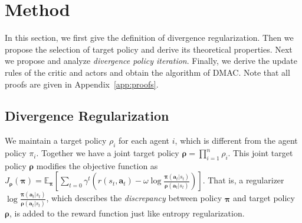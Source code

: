 \documentclass{article}
\begin{document}







\section{Method}
In this section, we first give the definition of divergence regularization. Then we propose the selection of target policy and derive its theoretical properties. Next we propose and analyze \textit{divergence policy iteration}. Finally, we derive the update rules of the critic and actors and obtain the algorithm of DMAC. Note that all proofs are given in Appendix~\ref{app:proofs}.


\subsection{Divergence Regularization}
We maintain a target policy $\rho_i$ for each agent $i$, which is different from the agent policy $\pi_i$. Together we have a joint target policy ${\bm{\rho}} = \prod_{i=1}^n \rho_i$. This joint target policy ${\bm{\rho}}$ modifies the objective function as 
$J_{\bm{\rho}}({\bm{\pi}}) = \mathbb{E}_{\bm{\pi}}\left[ \sum_{t = 0} \gamma^t \left(r(s_t,\bm{a}_t ) - \omega \log \frac{{\bm{\pi}}(\bm{a}_t|s_t)}{{\bm{\rho}}(\bm{a}_t|s_t)} \right)  \right].$
That is, a regularizer $\log\frac{{\bm{\pi}}(\bm{a}_t|s_t)}{{\bm{\rho}}(\bm{a}_t|s_t)}$, which describes the \textit{discrepancy} between policy ${\bm{\pi}}$ and target policy ${\bm{\rho}}$, is added to the reward function just like entropy regularization. 
\end{document}
